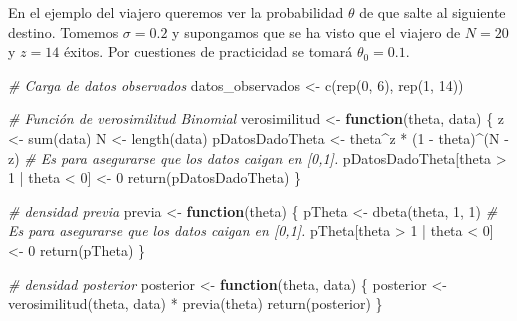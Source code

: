 \documentclass[
  12pt,
]{book}
\newenvironment{Shaded}{\begin{snugshade}}{\end{snugshade}}
\newcommand{\CommentTok}[1]{\textcolor[rgb]{0.56,0.35,0.01}{\textit{#1}}}
\newcommand{\ControlFlowTok}[1]{\textcolor[rgb]{0.13,0.29,0.53}{\textbf{#1}}}
\newcommand{\DecValTok}[1]{\textcolor[rgb]{0.00,0.00,0.81}{#1}}
\newcommand{\FunctionTok}[1]{\textcolor[rgb]{0.00,0.00,0.00}{#1}}
\newcommand{\NormalTok}[1]{#1}
\newcommand{\OtherTok}[1]{\textcolor[rgb]{0.56,0.35,0.01}{#1}}
\newcommand{\SpecialCharTok}[1]{\textcolor[rgb]{0.00,0.00,0.00}{#1}}
\theoremstyle{definition}
\theoremstyle{definition}
\theoremstyle{definition}
\theoremstyle{remark}
\begin{document}
En el ejemplo del viajero queremos ver la probabilidad \(\theta\) de
que salte al siguiente destino. Tomemos \(\sigma=0.2\) y supongamos
que se ha visto que el viajero de \(N=20\) y \(z=14\) éxitos. Por
cuestiones de practicidad se tomará \(\theta_0 = 0.1\).

\begin{Shaded}
\begin{Highlighting}[]
\CommentTok{\# Carga de datos observados}
\NormalTok{datos\_observados }\OtherTok{\textless{}{-}} \FunctionTok{c}\NormalTok{(}\FunctionTok{rep}\NormalTok{(}\DecValTok{0}\NormalTok{, }\DecValTok{6}\NormalTok{), }\FunctionTok{rep}\NormalTok{(}\DecValTok{1}\NormalTok{, }\DecValTok{14}\NormalTok{))}

\CommentTok{\# Función de verosimilitud Binomial}
\NormalTok{verosimilitud }\OtherTok{\textless{}{-}} \ControlFlowTok{function}\NormalTok{(theta, data) \{}
\NormalTok{    z }\OtherTok{\textless{}{-}} \FunctionTok{sum}\NormalTok{(data)}
\NormalTok{    N }\OtherTok{\textless{}{-}} \FunctionTok{length}\NormalTok{(data)}
\NormalTok{    pDatosDadoTheta }\OtherTok{\textless{}{-}}\NormalTok{ theta}\SpecialCharTok{\^{}}\NormalTok{z }\SpecialCharTok{*}\NormalTok{ (}\DecValTok{1} \SpecialCharTok{{-}}\NormalTok{ theta)}\SpecialCharTok{\^{}}\NormalTok{(N }\SpecialCharTok{{-}}\NormalTok{ z)}
    \CommentTok{\# Es para asegurarse que los datos caigan en [0,1].}
\NormalTok{    pDatosDadoTheta[theta }\SpecialCharTok{\textgreater{}} \DecValTok{1} \SpecialCharTok{|}\NormalTok{ theta }\SpecialCharTok{\textless{}} \DecValTok{0}\NormalTok{] }\OtherTok{\textless{}{-}} \DecValTok{0}
    \FunctionTok{return}\NormalTok{(pDatosDadoTheta)}
\NormalTok{\}}

\CommentTok{\# densidad previa}
\NormalTok{previa }\OtherTok{\textless{}{-}} \ControlFlowTok{function}\NormalTok{(theta) \{}
\NormalTok{    pTheta }\OtherTok{\textless{}{-}} \FunctionTok{dbeta}\NormalTok{(theta, }\DecValTok{1}\NormalTok{, }\DecValTok{1}\NormalTok{)}
    \CommentTok{\# Es para asegurarse que los datos caigan en [0,1].}
\NormalTok{    pTheta[theta }\SpecialCharTok{\textgreater{}} \DecValTok{1} \SpecialCharTok{|}\NormalTok{ theta }\SpecialCharTok{\textless{}} \DecValTok{0}\NormalTok{] }\OtherTok{\textless{}{-}} \DecValTok{0}
    \FunctionTok{return}\NormalTok{(pTheta)}
\NormalTok{\}}

\CommentTok{\# densidad posterior}
\NormalTok{posterior }\OtherTok{\textless{}{-}} \ControlFlowTok{function}\NormalTok{(theta, data) \{}
\NormalTok{    posterior }\OtherTok{\textless{}{-}} \FunctionTok{verosimilitud}\NormalTok{(theta, data) }\SpecialCharTok{*} \FunctionTok{previa}\NormalTok{(theta)}
    \FunctionTok{return}\NormalTok{(posterior)}
\NormalTok{\}}


\end{Highlighting}
\end{Shaded}
\end{document}
